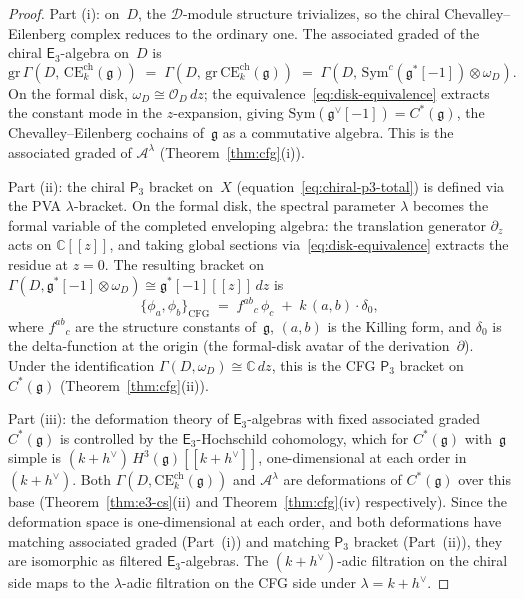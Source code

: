 \documentclass[11pt,reqno]{amsart}
\theoremstyle{definition}
\theoremstyle{remark}
\newcommand{\cA}{\mathcal{A}}
\newcommand{\cD}{\mathcal{D}}
\newcommand{\cO}{\mathcal{O}}
\newcommand{\CE}{\mathrm{CE}}
\newcommand{\Ethree}{\mathsf{E}_{3}}
\newcommand{\Pthree}{\mathsf{P}_{3}}
\newcommand{\Sym}{\mathrm{Sym}}
\newcommand{\fg}{\mathfrak{g}}
\newcommand{\CC}{\mathbb{C}}
\numberwithin{equation}{section}
\begin{document}
\begin{proof}
Part (i): on~$D$, the $\cD$-module structure trivializes,
so the chiral Chevalley--Eilenberg complex reduces to the
ordinary one. The associated graded of the chiral
$\Ethree$-algebra on~$D$ is
\[
  \mathrm{gr}\,\Gamma(D,\, \CE^{\mathrm{ch}}_k(\fg))
  \;=\;
  \Gamma(D,\, \mathrm{gr}\,\CE^{\mathrm{ch}}_k(\fg))
  \;=\;
  \Gamma(D,\, \Sym^c(\fg^*[-1]) \otimes \omega_D).
\]
On the formal disk, $\omega_D \cong \cO_D\,dz$; the
equivalence~\eqref{eq:disk-equivalence} extracts the
constant mode in the $z$-expansion, giving
$\Sym(\fg^\vee[-1]) = C^*(\fg)$, the
Chevalley--Eilenberg cochains of~$\fg$ as a commutative
algebra. This is the associated graded of $\cA^\lambda$
(Theorem~\ref{thm:cfg}(i)).

Part (ii): the chiral $\Pthree$ bracket on~$X$
(equation~\eqref{eq:chiral-p3-total}) is defined via the
PVA $\lambda$-bracket. On the formal disk, the spectral
parameter $\lambda$ becomes the formal variable of the
completed enveloping algebra: the translation generator
$\partial_z$ acts on $\CC[[z]]$, and taking global sections
via~\eqref{eq:disk-equivalence} extracts the residue at
$z = 0$. The resulting bracket on
$\Gamma(D, \fg^*[-1] \otimes \omega_D)
\cong \fg^*[-1][[z]]\,dz$ is
\[
  \{\phi_a, \phi_b\}_{\mathrm{CFG}}
  \;=\;
  f^{ab}{}_{c}\,\phi_c
  \;+\;
  k\,(a,b) \cdot \delta_0,
\]
where $f^{ab}{}_{c}$ are the structure constants of~$\fg$,
$(a,b)$ is the Killing form, and $\delta_0$ is the
delta-function at the origin (the formal-disk avatar of the
derivation~$\partial$). Under the identification
$\Gamma(D, \omega_D) \cong \CC\,dz$, this is the CFG
$\Pthree$ bracket on $C^*(\fg)$
(Theorem~\ref{thm:cfg}(ii)).

Part (iii): the deformation theory of $\Ethree$-algebras
with fixed associated graded $C^*(\fg)$ is controlled by
the $\Ethree$-Hochschild cohomology, which for
$C^*(\fg)$ with~$\fg$ simple is
$(k+h^\vee)\,H^3(\fg)[[k+h^\vee]]$, one-dimensional at each
order in $(k+h^\vee)$. Both
$\Gamma(D, \CE^{\mathrm{ch}}_k(\fg))$ and
$\cA^\lambda$ are deformations of $C^*(\fg)$ over this
base (Theorem~\ref{thm:e3-cs}(ii) and
Theorem~\ref{thm:cfg}(iv) respectively). Since the
deformation space is one-dimensional at each order, and
both deformations have matching associated graded
(Part~(i)) and matching $\Pthree$ bracket (Part~(ii)),
they are isomorphic as filtered $\Ethree$-algebras.
The $(k+h^\vee)$-adic filtration on the chiral side maps to
the $\lambda$-adic filtration on the CFG side under
$\lambda = k + h^\vee$.
\end{proof}
\end{document}
